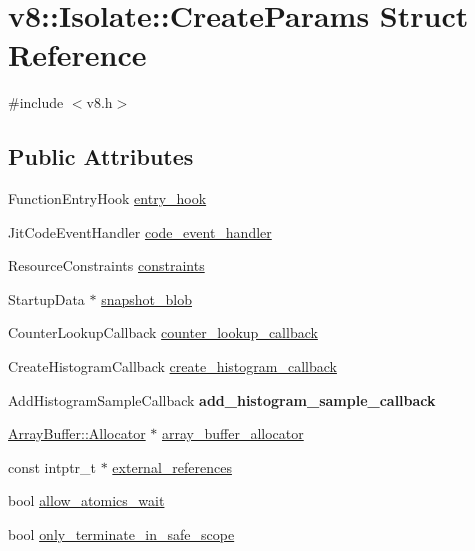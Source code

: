 \hypertarget{structv8_1_1Isolate_1_1CreateParams}{}\section{v8\+:\+:Isolate\+:\+:Create\+Params Struct Reference}
\label{structv8_1_1Isolate_1_1CreateParams}


{\ttfamily \#include $<$v8.\+h$>$}

\subsection*{Public Attributes}
\begin{DoxyCompactItemize}
\item 
Function\+Entry\+Hook \mbox{\hyperlink{structv8_1_1Isolate_1_1CreateParams_aa7aa18bbe2d86713e5b074a93b38dc60}{entry\+\_\+hook}}
\item 
Jit\+Code\+Event\+Handler \mbox{\hyperlink{structv8_1_1Isolate_1_1CreateParams_a783e3eba90ce6e2800bdd69197bbccdd}{code\+\_\+event\+\_\+handler}}
\item 
Resource\+Constraints \mbox{\hyperlink{structv8_1_1Isolate_1_1CreateParams_a2c570b306aa8c1c24cfe70e8eee50fa1}{constraints}}
\item 
Startup\+Data $\ast$ \mbox{\hyperlink{structv8_1_1Isolate_1_1CreateParams_a25d38476e4dec79ae96c59292eee4a64}{snapshot\+\_\+blob}}
\item 
Counter\+Lookup\+Callback \mbox{\hyperlink{structv8_1_1Isolate_1_1CreateParams_a10441abadd0b83a938303c92e7444fb6}{counter\+\_\+lookup\+\_\+callback}}
\item 
Create\+Histogram\+Callback \mbox{\hyperlink{structv8_1_1Isolate_1_1CreateParams_a11acf5fb9cdbc4c8bf15baf542507b49}{create\+\_\+histogram\+\_\+callback}}
\item 
\mbox{\label{structv8_1_1Isolate_1_1CreateParams_a3e0fb886996eb1f498b6cc157e11e280}} 
Add\+Histogram\+Sample\+Callback {\bfseries add\+\_\+histogram\+\_\+sample\+\_\+callback}
\item 
\mbox{\hyperlink{classv8_1_1ArrayBuffer_1_1Allocator}{Array\+Buffer\+::\+Allocator}} $\ast$ \mbox{\hyperlink{structv8_1_1Isolate_1_1CreateParams_a7c663f70b64290392eeaf164f57585f9}{array\+\_\+buffer\+\_\+allocator}}
\item 
const intptr\+\_\+t $\ast$ \mbox{\hyperlink{structv8_1_1Isolate_1_1CreateParams_a89b8c9dc74efbdcd93ab5786eae6fe19}{external\+\_\+references}}
\item 
bool \mbox{\hyperlink{structv8_1_1Isolate_1_1CreateParams_acade19de0f78ff15d76aaef2e292da72}{allow\+\_\+atomics\+\_\+wait}}
\item 
bool \mbox{\hyperlink{structv8_1_1Isolate_1_1CreateParams_af44a854a07944452589128b6cf3b9958}{only\+\_\+terminate\+\_\+in\+\_\+safe\+\_\+scope}}
\end{DoxyCompactItemize}


